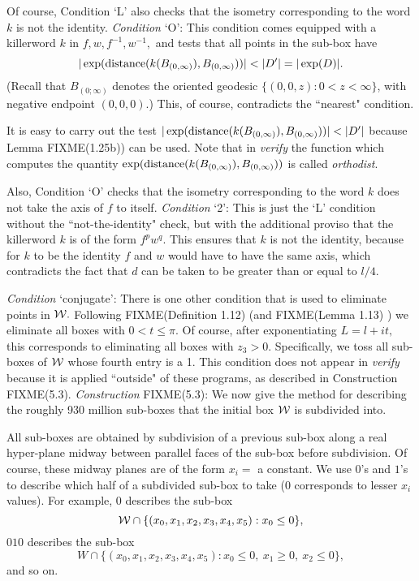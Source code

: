 Of course, Condition `L' also checks that the isometry corresponding to the word $k$ is not the identity.
{\it Condition}   `O':   This condition comes equipped with a killerword 
$k$ in $f, w, f^{-1}, w^{-1},$ and tests that all points in the sub-box have 
$$|\exp({\rm distance}(k(B_{(0,\infty)}),
B_{(0,\infty)}))| <  |D^{\prime}| = |\exp(D)|.$$    (Recall that 
$B_{(0;\infty)}$ denotes the oriented geodesic $\{(0,0,z): 0< z < \infty \}$,
with negative endpoint $(0,0,0).$)
This, of course, contradicts the ``nearest" condition.

It is easy to carry out the test $|\exp({\rm distance}(k(B_{(0,\infty)}), B_{(0,\infty)}))| <  |D^{\prime}|$ because
Lemma FIXME(1.25b)) can be used. Note that in {\it verify} the function which computes the quantity
$\exp({\rm distance}(k(B_{(0,\infty)}), B_{(0,\infty)}))$ is called {\it orthodist}.  

Also, Condition `O' checks that the isometry corresponding to the word $k$ does not take the axis of $f$ to itself.
{\it Condition}   `2':  This is just the `L' condition without the ``not-the-identity" check, but with the additional
proviso that the killerword $k$ is of the form $f^p w^q.$ This ensures that $k$ is not the identity, because for $k$ to be
the identity $f$ and $w$ would have to have the same axis, which contradicts the fact that $d$ can be taken to be
greater than or equal to $l/4.$
\eject

{\it Condition}  `conjugate':  There is one other condition that is used to eliminate points in ${\cal W}.$  Following
FIXME(Definition 1.12)
 (and 
FIXME(Lemma 1.13)
) we eliminate all boxes with $0 < t \le \pi.$  Of course, after exponentiating $L = l+it,$
this corresponds to eliminating all boxes with $z_3 > 0.$ Specifically, we toss all sub-boxes of ${\cal W}$ whose fourth
entry is a 1. This condition does not appear in {\it verify} because it is applied ``outside" of these
programs, as described in Construction 
FIXME(5.3).
 {\it Construction} FIXME(5.3): 
We now give the method for describing the roughly 930 million sub-boxes that the initial box ${\cal W}$ is subdivided into.

All sub-boxes are obtained by subdivision of a previous sub-box along a real
hyper-plane midway between parallel faces of the sub-box before
subdivision.  Of course, these midway planes are of the form $x_i = $ a
constant.   We use $0$'s and $1$'s to describe which half of a subdivided
sub-box to take ($0$ corresponds to lesser $x_i$ values).  For example, 0
describes 
the sub-box $${\cal W} \cap \{(x_0,x_1,x_2,x_3,x_4,x_5): x_0 \le 0 \},$$ 
$010$ describes the sub-box 
$$W \cap \{(x_0,x_1,x_2,x_3, x_4,x_5) : x_0 \le 0,\ x_1 \ge 0,\ x_2 \le 0 \},$$
and so on.

